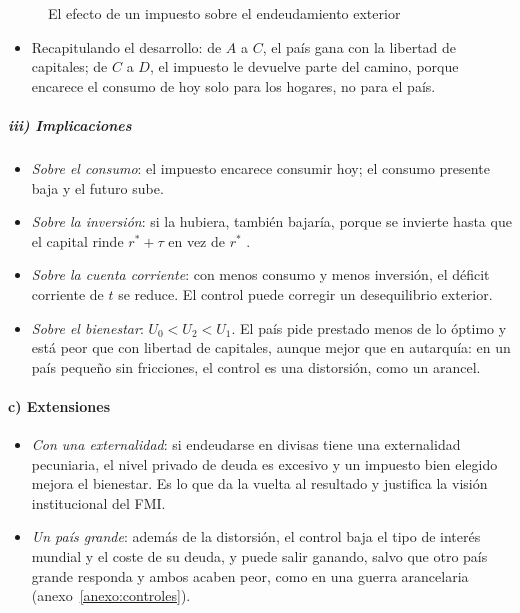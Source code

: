 \documentclass[11pt]{article}
\begin{document}
\begin{figure}[H]
\centering
\caption{El efecto de un impuesto sobre el endeudamiento exterior}\label{fig:controles-capital}
\end{figure}

\begin{itemize}
\item Recapitulando el desarrollo: de $A$ a $C$, el país gana con la libertad de capitales; de $C$ a $D$, el impuesto le devuelve parte del camino, porque encarece el consumo de hoy solo para los hogares, no para el país.
\end{itemize}

\subparagraph{iii) Implicaciones}

\begin{itemize}
\item \emph{Sobre el consumo}: el impuesto encarece consumir hoy; el consumo presente baja y el futuro sube.
\item \emph{Sobre la inversión}: si la hubiera, también bajaría, porque se invierte hasta que el capital rinde $r^*+\tau$ en vez de $r^*$ .
\item \emph{Sobre la cuenta corriente}: con menos consumo y menos inversión, el déficit corriente de $t$ se reduce. El control puede corregir un desequilibrio exterior.
\item \emph{Sobre el bienestar}: $U_0<U_2<U_1$. El país pide prestado menos de lo óptimo y está peor que con libertad de capitales, aunque mejor que en autarquía: en un país pequeño sin fricciones, el control es una distorsión, como un arancel.
\end{itemize}

\paragraph{c) Extensiones}

\begin{itemize}
\item \emph{Con una externalidad}: si endeudarse en divisas tiene una externalidad pecuniaria, el nivel privado de deuda es excesivo y un impuesto bien elegido mejora el bienestar\nocite{Korinek2011New}. Es lo que da la vuelta al resultado y justifica la visión institucional del FMI.
\item \emph{Un país grande}: además de la distorsión, el control baja el tipo de interés mundial y el coste de su deuda, y puede salir ganando, salvo que otro país grande responda y ambos acaben peor, como en una guerra arancelaria (anexo~\ref{anexo:controles}).
\end{itemize}
\end{document}
